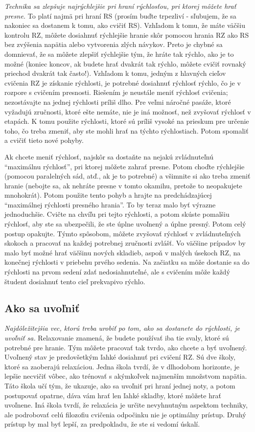 \emph{Technika sa zlepšuje najrýchlejšie pri hraní rýchlosťou, pri ktorej môžete hrať presne.} To platí najmä pri hraní RS (prosím buďte trpezliví - sľubujem, že sa nakoniec sa dostanem k tomu, ako cvičiť RS). Vzhľadom k tomu, že máte väčšiu kontrolu RZ, môžete dosiahnuť rýchlejšie hranie skôr pomocou hrania RZ ako RS bez zvýšenia napätia alebo vytvorenia zlých návykov. Preto je chybné sa domnievať, že sa môžete zlepšiť rýchlejšie tým, že hráte tak rýchlo, ako je to možné (koniec koncov, ak budete hrať dvakrát tak rýchlo, môžete cvičiť rovnaký priechod dvakrát tak často!). Vzhľadom k tomu, jedným z hlavných cieľov cvičenia RZ je získanie rýchlosti, je potrebné dosiahnuť rýchlosť rýchlo, čo je v rozpore s cvičením presnosti. Riešením je neustále meniť rýchlosť cvičenia; nezostávajte na jednej rýchlosti príliš dlho. Pre veľmi náročné pasáže, ktoré vyžadujú zručnosti, ktoré ešte nemáte, nie je iná možnosť, než  zvyšovať rýchlosť v etapách. K tomu použite rýchlosti, ktoré sú príliš vysoké na prieskum pre určenie toho, čo treba zmeniť, aby ste mohli hrať na týchto rýchlostiach. Potom spomaliť a cvičiť tieto nové pohyby.

Ak chcete meniť rýchlosť, najskôr sa dostaňte na nejakú zvládnuteľnú “maximálnu rýchlosť”, pri ktorej  môžete zahrať presne. Potom choďte rýchlejšie (pomocou paralelných sád, atď., ak je to potrebné) a všimnite si ako treba zmeniť hranie (nebojte sa, ak nehráte presne v tomto okamihu, pretože to neopakujete mnohokrát). Potom použite tento pohyb a hrajte na predchádzajúcej “maximálnej rýchlosti presného hrania”. To by teraz malo byť výrazne jednoduchšie. Cvičte na chvíľu pri tejto rýchlosti, a potom skúste pomalšiu rýchlosť, aby ste sa ubezpečili, že ste úplne uvoľnený a úplne presný. Potom celý postup opakujte. Týmto spôsobom, môžete zvyšovať rýchlosť v zvládnuteľných skokoch a pracovať na každej potrebnej zručnosti zvlášť. Vo väčšine prípadov by malo byť možné hrať väčšinu nových skladieb, aspoň v malých úsekoch RZ, na konečnej rýchlosti v priebehu prvého sedenia. Na začiatku sa môže dostanie sa do rýchlosti na prvom sedení zdať nedosiahnuteľné, ale s cvičením môže každý študent dosiahnuť tento cieľ prekvapivo rýchlo.

\subsection{Ako sa uvoľniť}
\emph{Najdôležitejšia vec, ktorú treba urobiť po tom, ako sa dostanete do rýchlosti, je uvoľniť sa.} Relaxovanie znamená, že budete používať iba tie svaly, ktoré sú potrebné pre hranie. Tým môžete pracovať tak tvrdo, ako chcete a byť uvoľnený. Uvoľnený stav je predovšetkým ľahké dosiahnuť pri cvičení RZ. Sú dve školy, ktoré sa zaoberajú relaxáciou. Jedna škola tvrdí, že v dlhodobom horizonte, je lepšie necvičiť vôbec, ako trénovať s akýmkoľvek najmenším množstvom napätia. Táto škola učí tým, že ukazuje, ako sa uvoľniť pri hraní jednej noty, a potom postupovať opatrne, dáva vám hrať len ľahké skladby, ktoré môžete hrať uvoľnene. Iná škola tvrdí, že relaxácia je určite nevyhnutným aspektom techniky, ale podrobovať celú filozofiu cvičenia odpočinku nie je optimálny prístup. Druhý prístup by mal byť lepší, za predpokladu, že ste si vedomí úskalí.

